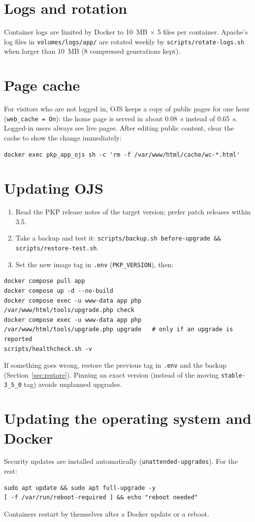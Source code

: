 \documentclass[11pt,a4paper]{report}
\newcommand{\code}[1]{\texttt{\small #1}}
\newcommand{\file}[1]{\texttt{\small #1}}
\begin{document}
\section{Logs and rotation}
Container logs are limited by Docker to 10~MB $\times$ 5 files per container. Apache's log files
in \file{volumes/logs/app/} are rotated weekly by \file{scripts/rotate-logs.sh} when larger than
10~MB (8 compressed generations kept).

\section{Page cache}
For visitors who are not logged in, OJS keeps a copy of public pages for one hour
(\code{web\_cache = On}): the home page is served in about 0.08~s instead of 0.65~s. Logged-in
users always see live pages. After editing public content, clear the cache to show the change
immediately:
\begin{lstlisting}
docker exec pkp_app_ojs sh -c 'rm -f /var/www/html/cache/wc-*.html'
\end{lstlisting}

\section{Updating OJS}
\begin{enumerate}
  \item Read the PKP release notes of the target version; prefer patch releases within 3.5.
  \item Take a backup and test it: \code{scripts/backup.sh before-upgrade \&\& scripts/restore-test.sh}.
  \item Set the new image tag in \file{.env} (\code{PKP\_VERSION}), then:
\end{enumerate}
\begin{lstlisting}
docker compose pull app
docker compose up -d --no-build
docker compose exec -u www-data app php /var/www/html/tools/upgrade.php check
docker compose exec -u www-data app php /var/www/html/tools/upgrade.php upgrade   # only if an upgrade is reported
scripts/healthcheck.sh -v
\end{lstlisting}
If something goes wrong, restore the previous tag in \file{.env} and the backup (Section~\ref{sec:restore}).
Pinning an exact version (instead of the moving \code{stable-3\_5\_0} tag) avoids unplanned upgrades.

\section{Updating the operating system and Docker}
Security updates are installed automatically (\code{unattended-upgrades}). For the rest:
\begin{lstlisting}
sudo apt update && sudo apt full-upgrade -y
[ -f /var/run/reboot-required ] && echo "reboot needed"
\end{lstlisting}
Containers restart by themselves after a Docker update or a reboot.
\end{document}
